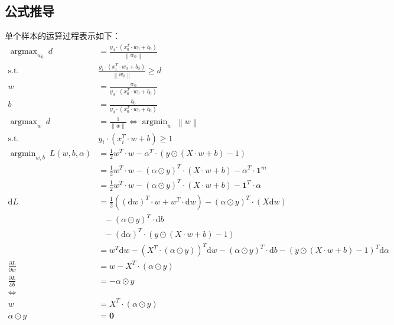 \documentclass[12pt, a4paper, oneside]{ctexart}
\begin{document}
\subsection{公式推导}
单个样本的运算过程表示如下：    
\begin{align}
    \mathop{\arg\max}_{w_0} \ d &= \frac{y_0 \cdot (x_0^T \cdot w_0 + b_0)}{ \left\|w_0\right\|} 			\nonumber\\
	\mathrm{ s.t. }\ \   &\frac{y_i \cdot (x_i^T \cdot w_0 + b_0)}{ \left\|w_0\right\|} \geq d				\nonumber\\
	w &= \frac{w_0 }{ y_0 \cdot (x_0^T \cdot w_0 + b_0)} 			\nonumber\\
    b &= \frac{b_0 }{ y_0 \cdot (x_0^T \cdot w_0 + b_0)} 			\nonumber\\
	\mathop{\arg\max}_{w} \ d &= \frac{1}{ \left\|w\right\|} 	\iff \mathop{\arg\min}_{w} \ \left\|w\right\|		\nonumber\\
    \mathrm{ s.t. }\ \   & y_i \cdot (x_i^T \cdot w + b) \geq 1				\nonumber\\
    \mathop{\arg\min}_{w,b} \ 	L(w, b, {\alpha}) &= \frac{1}{2}	w^T \cdot w  - {\alpha} ^T \cdot  (y \odot (X \cdot w + b) - 1) \nonumber\\
        &= \frac{1}{2}	w^T \cdot w  - (\alpha \odot y) ^T \cdot  (X \cdot w + b) - \alpha^T \cdot \boldsymbol{1}^m \nonumber\\
        &= \frac{1}{2}	w^T \cdot w  - (\alpha \odot y) ^T \cdot  (X \cdot w + b) - \boldsymbol{1}^T\cdot\alpha \nonumber\\
    \mathrm{d}L &= \frac{1}{2}((\mathrm{d}w)^T \cdot w + w^T \cdot \mathrm{d}w) - (\alpha \odot y) ^T \cdot(X\mathrm{d}w) \nonumber \\
                & \ \ \  - (\alpha \odot y) ^T \cdot \mathrm{d}b \nonumber\\
                & \ \ \  - (\mathrm{d}\alpha)^T \cdot (y \odot (X \cdot w + b) - 1) \nonumber \\
                &= w^T\mathrm{d}w - (X^T\cdot(\alpha \odot y))^T\mathrm{d}w - (\alpha \odot y) ^T \cdot \mathrm{d}b - (y \odot (X \cdot w + b) - 1)^T\mathrm{d}\alpha \nonumber \\
    \frac{\partial L}{\partial w} &= w - X^T\cdot(\alpha \odot y) \nonumber \\
    \frac{\partial L}{\partial b} &= - \alpha \odot y \nonumber \\
    \iff \nonumber \\
    w &= X^T\cdot(\alpha \odot y) \nonumber \\
    \alpha \odot y &= \boldsymbol{0} \nonumber \\

\end{align}
\end{document}
